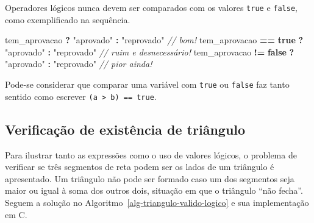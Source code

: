 \documentclass[
  11pt,
  a4paper,
]{scrbook}
\newenvironment{Shaded}{\begin{snugshade}}{\end{snugshade}}
\newcommand{\CommentTok}[1]{\textcolor[rgb]{0.56,0.35,0.01}{\textit{#1}}}
\newcommand{\KeywordTok}[1]{\textcolor[rgb]{0.13,0.29,0.53}{\textbf{#1}}}
\newcommand{\NormalTok}[1]{#1}
\newcommand{\OperatorTok}[1]{\textcolor[rgb]{0.81,0.36,0.00}{\textbf{#1}}}
\newcommand{\StringTok}[1]{\textcolor[rgb]{0.31,0.60,0.02}{#1}}
\begin{document}
\begin{tcolorbox}[enhanced jigsaw, arc=.35mm, bottomtitle=1mm, colbacktitle=quarto-callout-tip-color!10!white, title=\textcolor{quarto-callout-tip-color}{\faLightbulb}\hspace{0.5em}{Dica}, toprule=.15mm, left=2mm, opacityback=0, colback=white, colframe=quarto-callout-tip-color-frame, opacitybacktitle=0.6, bottomrule=.15mm, leftrule=.75mm, toptitle=1mm, coltitle=black, titlerule=0mm, rightrule=.15mm, breakable]

Operadores lógicos nunca devem ser comparados com os valores
\texttt{true} e \texttt{false}, como exemplificado na sequência.

\begin{Shaded}
\begin{Highlighting}[]
\NormalTok{tem\_aprovacao }\OperatorTok{?} \StringTok{"aprovado"} \OperatorTok{:} \StringTok{"reprovado"}           \CommentTok{// bom!}
\NormalTok{tem\_aprovacao }\OperatorTok{==} \KeywordTok{true} \OperatorTok{?} \StringTok{"aprovado"} \OperatorTok{:} \StringTok{"reprovado"}   \CommentTok{// ruim e desnecessário!}
\NormalTok{tem\_aprovacao }\OperatorTok{!=} \KeywordTok{false} \OperatorTok{?} \StringTok{"aprovado"} \OperatorTok{:} \StringTok{"reprovado"}  \CommentTok{// pior ainda!}
\end{Highlighting}
\end{Shaded}

Pode-se considerar que comparar uma variável com \texttt{true} ou
\texttt{false} faz tanto sentido como escrever
\texttt{(a\ \textgreater{}\ b)\ ==\ true}.

\end{tcolorbox}

\subsection{Verificação de existência de
triângulo}\label{verificauxe7uxe3o-de-existuxeancia-de-triuxe2ngulo}

Para ilustrar tanto as expressões como o uso de valores lógicos, o
problema de verificar se três segmentos de reta podem ser os lados de um
triângulo é apresentado. Um triângulo não pode ser formado caso um dos
segmentos seja maior ou igual à soma dos outros dois, situação em que o
triângulo ``não fecha''. Seguem a solução no
Algoritmo~\ref{alg-triangulo-valido-logico} e sua implementação em C.
\end{document}
